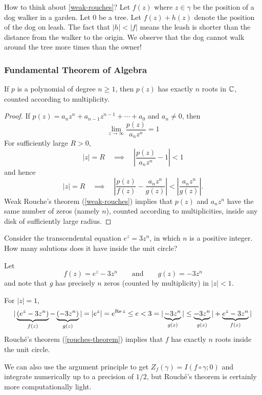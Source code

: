 \documentclass[12pt]{article}
\begin{document}
\rmk How to think about \cref{weak-rouches}? Let $f(z)$ where $z\in \gamma$ be the position of a dog walker in a garden. Let 0 be a tree. Let $f(z)+h(z)$ denote the position of the dog on leash. The fact that $|h|<|f|$ means the leash is shorter than the distance from the walker to the origin. We observe that the dog cannot walk around the tree more times than the owner!

\subsubsection{Fundamental Theorem of Algebra}
\begin{corollary}[FTA]
    If $p$ is a polynomial of degree $n \geq 1$, then $p(z)$ has exactly $n$ roots in $\mathbb{C}$, counted according to multiplicity.
\end{corollary}
\begin{proof}
    If $p(z)=a_{n}z^{n}+a_{n-1}z^{n-1}+\cdots+a_{0}$ and $a_{n}\neq0$, then \[\lim_{z\to\infty}\frac{p(z)}{a_{n}z^{n}}=1\]
    For sufficiently large $R>0$,
    $$|z|=R\quad\implies\quad\left|\frac{p(z)}{a_{n}z^{n}}-1\right|<1$$
    and hence   
    $$|z|=R\quad\implies\quad\left|\frac{p(z)}{f(z)}-\frac{a_{n}z^{n}}{g(z)}\right|<\left|\frac{a_{n}z^{n}}{g(z)}\right|.$$
    Weak Rouche's theorem (\cref{weak-rouches}) implies that $p(z)$ and $a_nz^{n}$ have the same number of zeros (namely $n$), counted according to multiplicities, inside any disk of sufficiently large radius.    
\end{proof}

\eg Consider the transcendental equation $e^{z}=3z^{n}$, in which $n$ is a positive integer. How many solutions does it have inside the unit circle?

Let $$f(z)=e^{z}-3z^{n}\qquad\text{and}\qquad g(z)=-3z^{n}$$ and note that $g$ has precisely $n$ zeros (counted by multiplicity) in $|z|<1$. 

For $|z|=1$,
$$|\underbrace{(e^{z}-3z^{n})}_{f(z)}-\underbrace{(-3z^{n})}_{g(z)}|=|e^{z}|=e^{\operatorname{Re} z}\leq e<3=|\underbrace{-3z^{n}}_{g(z)}|\leq \underbrace{-3z^{n}}_{g(z)}| + \underbrace{e^{z}-3z^n}_{f(z)}|$$
Rouch\'e's theorem (\cref{rouches-theorem}) implies that $f$ has exactly $n$ roots inside the unit circle.

\rmk We can also use the argument principle to get $Z_f(\gamma)=I(f\circ \gamma; 0)$ and integrate numerically up to a precision of $1/2$, but Rouch\'e's theorem is certainly more computationally light.
\end{document}
